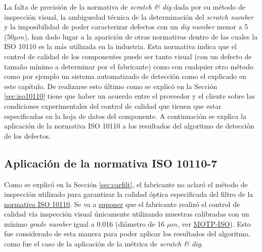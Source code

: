  La falta de precisión de la normativa de \textit{scratch \& dig} dada por su método de inspección visual, la ambiguedad técnica de la determinación del \textit{scratch number} y la imposibilidad de poder caracterizar defectos con un \textit{dig number} menor a 5 (50$\mu m$), han dado lugar a la aparición de otras normativas dentro de las cuales la ISO 10110 es la más utilizada en la industria. Esta normativa indica que el control de calidad de los componentes puede ser tanto visual (con un defecto de tamaño mínimo a determinar por el fabricante) como con cualquier otro método como por ejemplo un sistema automatizado de detección como el explicado en este capítulo. De realizarse esto último como se explicó en la Sección \ref{sec:iso10110} tiene que haber un acuerdo entre el proveedor y el cliente sobre las condiciones experimentales del control de calidad que tienen que estar especificadas en la hoja de datos del componente. A continuación se explica la aplicación de la normativa ISO 10110 a los resultados del algoritmo de detección de los defectos.
 
\singlespacing
\subsection{Aplicación de la normativa ISO 10110-7}
\label{sec:apiso}

\hspace{0.5cm}Como se explicó en la Sección \ref{sec:carfilt}, el fabricante no aclaró el método de inspección utilizado para garantizar la calidad óptica especificada del filtro de la \underline{normativa ISO 10110}. Se va a \underline{suponer} que el fabricante realizó el control de calidad vía inspección visual únicamente utilizando muestras calibradas con un mínimo \textit{grade number} igual a 0.016 (diámetro de 16 $\mu m$, ver \href{https://www.thorlabs.com/thorproduct.cfm?partnumber=MOTP-ISO}{MOTP-ISO}). Esto fue considerado de esta manera para poder aplicar los resultados del algoritmo, como fue el caso de la aplicación de la métrica de \textit{scratch \& dig}.

